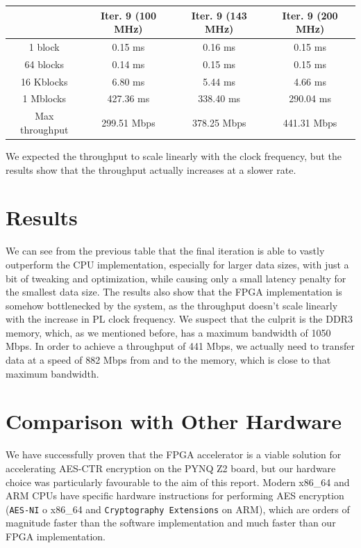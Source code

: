 \documentclass[12pt,oneside,a4paper]{article}
\begin{document}
\begin{table}[h!]
	\centering
	\begin{tabular}{cccc}
		\toprule
		 & Iter. 9 (100 MHz) & Iter. 9 (143 MHz) & Iter. 9 (200 MHz) \\
		\midrule
		1 block & 0.15 ms & 0.16 ms & 0.15 ms \\
		64 blocks & 0.14 ms & 0.15 ms & 0.15 ms \\
		16 Kblocks & 6.80 ms & 5.44 ms & 4.66 ms \\
		1 Mblocks & 427.36 ms & 338.40 ms & 290.04 ms \\
		Max throughput & 299.51 Mbps & 378.25 Mbps & 441.31 Mbps \\
		\bottomrule
	\end{tabular}
\end{table}

We expected the throughput to scale linearly with the clock frequency, but the results show that the throughput actually increases at a slower rate.

\section{Results} \label{sec:results}
We can see from the previous table that the final iteration is able to vastly outperform the CPU implementation, especially for larger data sizes, with just a bit of tweaking and optimization, while causing only a small latency penalty for the smallest data size.
The results also show that the FPGA implementation is somehow bottlenecked by the system, as the throughput doesn't scale linearly with the increase in PL clock frequency.
We suspect that the culprit is the DDR3 memory, which, as we mentioned before, has a maximum bandwidth of 1050 Mbps. In order to achieve a throughput of 441 Mbps, we actually need to transfer data at a speed of 882 Mbps from and to the memory, which is close to that maximum bandwidth.

\section{Comparison with Other Hardware} \label{sec:conclusions}
We have successfully proven that the FPGA accelerator is a viable solution for accelerating AES-CTR encryption on the PYNQ Z2 board, but our hardware choice was particularly favourable to the aim of this report.
Modern x86\_64 and ARM CPUs have specific hardware instructions for performing AES encryption (\texttt{AES-NI} \cite{aes:aes-ni} o x86\_64 and \texttt{Cryptography Extensions} \cite{aes:arm-extensions} on ARM), which are orders of magnitude faster than the software implementation and much faster than our FPGA implementation.
\end{document}
